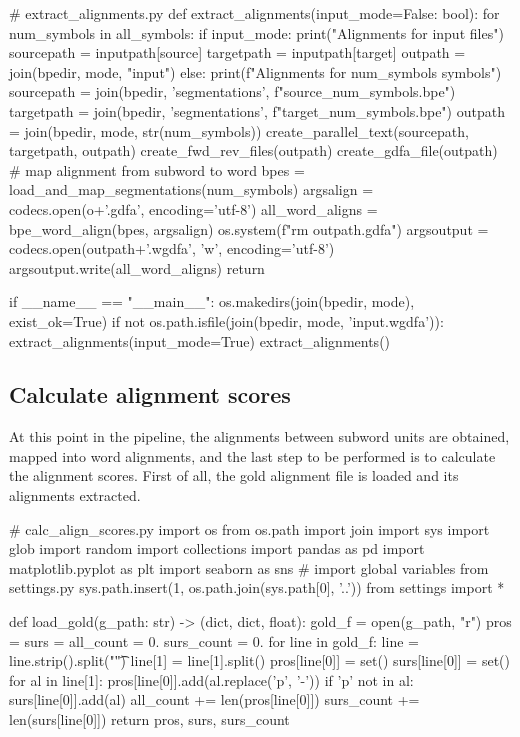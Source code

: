 \begin{python}
# extract_alignments.py
def extract_alignments(input_mode=False: bool):
  for num_symbols in all_symbols:
    if input_mode:
      print("Alignments for input files")
      sourcepath = inputpath[source]
      targetpath = inputpath[target]
      outpath = join(bpedir, mode, "input")
    else:
      print(f"Alignments for {num_symbols} symbols")
      sourcepath = join(bpedir, 'segmentations', f"{source}_{num_symbols}.bpe")
      targetpath = join(bpedir, 'segmentations', f"{target}_{num_symbols}.bpe")
      outpath = join(bpedir, mode, str(num_symbols))
    create_parallel_text(sourcepath, targetpath, outpath)
    create_fwd_rev_files(outpath)
    create_gdfa_file(outpath)
    # map alignment from subword to word
    bpes = load_and_map_segmentations(num_symbols)
    argsalign = codecs.open(o+'.gdfa', encoding='utf-8')
    all_word_aligns = bpe_word_align(bpes, argsalign)
    os.system(f"rm {outpath}.gdfa")
    argsoutput = codecs.open(outpath+'.wgdfa', 'w', encoding='utf-8')
    argsoutput.write(all_word_aligns)
  return

if __name__ == "__main__":
  os.makedirs(join(bpedir, mode), exist_ok=True)
  if not os.path.isfile(join(bpedir, mode, 'input.wgdfa')):
    extract_alignments(input_mode=True)
  extract_alignments()
\end{python}

\subsection{Calculate alignment scores}

At this point in the pipeline, the alignments between subword units are obtained, mapped into word alignments, and the last step to be performed is to calculate the alignment scores. First of all, the gold alignment file is loaded and its alignments extracted.

\begin{python}
# calc_align_scores.py
import os
from os.path import join
import sys
import glob
import random
import collections
import pandas as pd
import matplotlib.pyplot as plt
import seaborn as sns
# import global variables from settings.py
sys.path.insert(1, os.path.join(sys.path[0], '..'))
from settings import *

def load_gold(g_path: str) -> (dict, dict, float):
  gold_f = open(g_path, "r")
  pros = {}
  surs = {}
  all_count = 0.
  surs_count = 0.
  for line in gold_f:
    line = line.strip().split("\t")
    line[1] = line[1].split()
    pros[line[0]] = set()
    surs[line[0]] = set()
    for al in line[1]:
      pros[line[0]].add(al.replace('p', '-'))
      if 'p' not in al:
        surs[line[0]].add(al)
    all_count += len(pros[line[0]])
    surs_count += len(surs[line[0]])
  return pros, surs, surs_count
\end{python}

